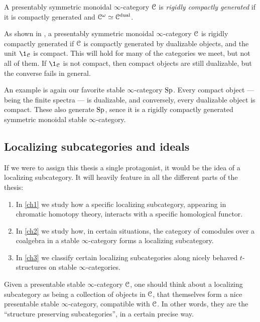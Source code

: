 \begin{definition}
    \label{ch0:rigidly-generated-category}
    A presentably symmetric monoidal $\infty$-category $\EuScript{C}$ is \emph{rigidly compactly generated} if it is compactly generated and $\EuScript{C}^\omega\simeq \EuScript{C}^{\mathrm{dual}}$. 
\end{definition}

\begin{remark}
    \label{ch0:rm:compacts-equal-dualizable}
    As shown in \cite[2.1.3]{hovey-palmiery-strickland_97}, a presentably symmetric monoidal $\infty$-category $\EuScript{C}$ is rigidly compactly generated if $\EuScript{C}$ is compactly generated by dualizable objects, and the unit $\1_\C$ is compact. This will hold for many of the categories we meet, but not all of them. If $\1_\C$ is not compact, then compact objects are still dualizable, but the converse fails in general. 
\end{remark}

An example is again our favorite stable $\infty$-category $\mathrm{Sp}$. Every compact object --- being the finite spectra --- is dualizable, and conversely, every dualizable object is compact. These also generate $\mathrm{Sp}$, sence it is a rigidly compactly generated symmetric monoidal stable $\infty$-category. 





\subsection{Localizing subcategories and ideals}
\label{ch0:ssec:localizing-subcategories-and-ideals}

If we were to assign this thesis a single protagonist, it would be the idea of a localizing subcategory. It will heavily feature in all the different parts of the thesis: 
\begin{enumerate}
    \item In \cref{ch1} we study how a specific localizing subcategory, appearing in chromatic homotopy theory, interacts with a specific homological functor.
    \item In \cref{ch2} we study how, in certain situations, the category of comodules over a coalgebra in a stable $\infty$-category forms a localizing subcategory. 
    \item In \cref{ch3} we classify certain localizing subcategories along nicely behaved $t$-structures on stable $\infty$-categories. 
\end{enumerate}

Given a presentable stable $\infty$-category $\EuScript{C}$, one should think about a localizing subcategory as being a collection of objects in $\EuScript{C}$, that themselves form a nice presentable stable $\infty$-category, compatible with $\EuScript{C}$. In other words, they are the ``structure preserving subcategories'', in a certain precise way. 

